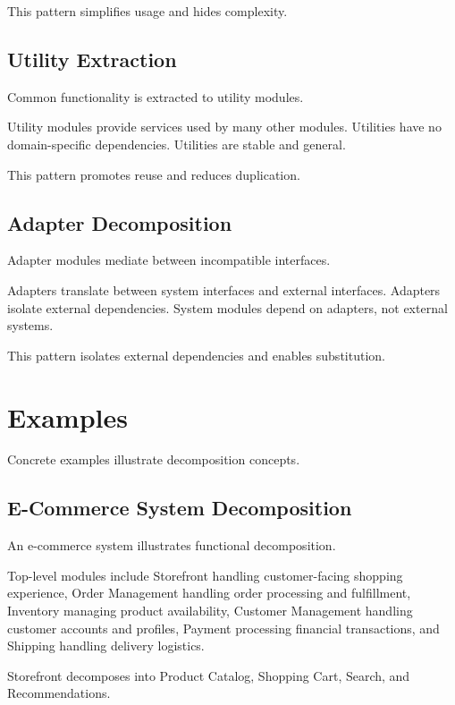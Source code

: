 \documentclass[11pt]{article}
\begin{document}
This pattern simplifies usage and hides complexity.

\subsection{Utility Extraction}

Common functionality is extracted to utility modules.

Utility modules provide services used by many other modules. Utilities have no domain-specific dependencies. Utilities are stable and general.

This pattern promotes reuse and reduces duplication.

\subsection{Adapter Decomposition}

Adapter modules mediate between incompatible interfaces.

Adapters translate between system interfaces and external interfaces. Adapters isolate external dependencies. System modules depend on adapters, not external systems.

This pattern isolates external dependencies and enables substitution.

\section{Examples}

Concrete examples illustrate decomposition concepts.

\subsection{E-Commerce System Decomposition}

An e-commerce system illustrates functional decomposition.

Top-level modules include Storefront handling customer-facing shopping experience, Order Management handling order processing and fulfillment, Inventory managing product availability, Customer Management handling customer accounts and profiles, Payment processing financial transactions, and Shipping handling delivery logistics.

Storefront decomposes into Product Catalog, Shopping Cart, Search, and Recommendations.
\end{document}
